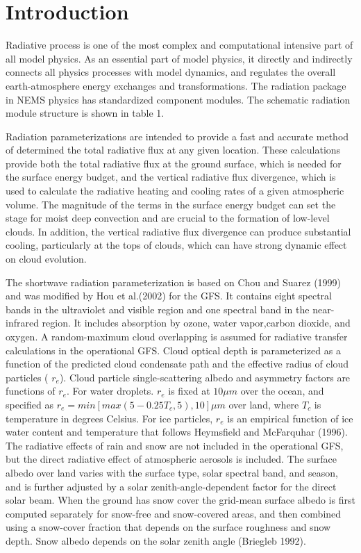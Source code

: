 \hypertarget{index_Introduction}{}\section{Introduction}\label{index_Introduction}
Radiative process is one of the most complex and computational intensive part of all model physics. As an essential part of model physics, it directly and indirectly connects all physics processes with model dynamics, and regulates the overall earth-\/atmosphere energy exchanges and transformations. The radiation package in N\+E\+MS physics has standardized component modules. The schematic radiation module structure is shown in table 1.



Radiation parameterizations are intended to provide a fast and accurate method of determined the total radiative flux at any given location. These calculations provide both the total radiative flux at the ground surface, which is needed for the surface energy budget, and the vertical radiative flux divergence, which is used to calculate the radiative heating and cooling rates of a given atmospheric volume. The magnitude of the terms in the surface energy budget can set the stage for moist deep convection and are crucial to the formation of low-\/level clouds. In addition, the vertical radiative flux divergence can produce substantial cooling, particularly at the tops of clouds, which can have strong dynamic effect on cloud evolution.

The shortwave radiation parameterization is based on Chou and Suarez (1999) and was modified by Hou et al.(2002) for the G\+FS. It contains eight spectral bands in the ultraviolet and visible region and one spectral band in the near-\/infrared region. It includes absorption by ozone, water vapor,carbon dioxide, and oxygen. A random-\/maximum cloud overlapping is assumed for radiative transfer calculations in the operational G\+FS. Cloud optical depth is parameterized as a function of the predicted cloud condensate path and the effective radius of cloud particles ( $r_e$). Cloud particle single-\/scattering albedo and asymmetry factors are functions of $r_e$. For water droplets. $r_e$ is fixed at $10\mu m$ over the ocean, and specified as $r_e=min[max(5-0.25T_c , 5),10]\mu m$ over land, where $T_c$ is temperature in degrees Celsius. For ice particles, $r_e$ is an empirical function of ice water content and temperature that follows Heymsfield and Mc\+Farquhar (1996). The radiative effects of rain and snow are not included in the operational G\+FS, but the direct radiative effect of atmospheric aerosols is included. The surface albedo over land varies with the surface type, solar spectral band, and season, and is further adjusted by a solar zenith-\/angle-\/dependent factor for the direct solar beam. When the ground has snow cover the grid-\/mean surface albedo is first computed separately for snow-\/free and snow-\/covered areas, and then combined using a snow-\/cover fraction that depends on the surface roughness and snow depth. Snow albedo depends on the solar zenith angle (Briegleb 1992).

